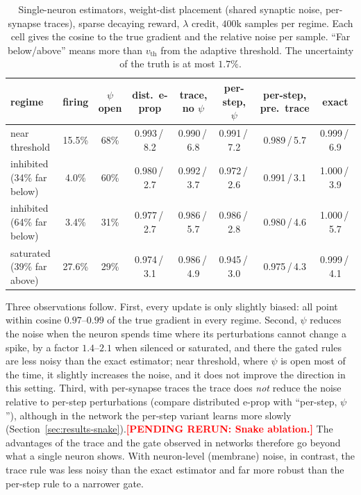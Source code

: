 \documentclass[10pt,twocolumn]{article}
\newcommand{\pending}[1]{\textcolor{red}{\bfseries[PENDING RERUN#1]}}
\begin{document}
\begin{table}[h]
\centering\footnotesize
\begin{tabular}{@{}lccccccc@{}}
\toprule
regime & firing & $\psi$ open & dist.\ e-prop & trace, no $\psi$ & per-step, $\psi$ & per-step, pre.\ trace & exact \\
\midrule
near threshold          & 15.5\% & 68\% & 0.993\,/\,8.2 & 0.990\,/\,6.8 & 0.991\,/\,7.2 & 0.989\,/\,5.7 & 0.999\,/\,6.9 \\
inhibited (34\% far below) & 4.0\% & 60\% & 0.980\,/\,2.7 & 0.992\,/\,3.7 & 0.972\,/\,2.6 & 0.991\,/\,3.1 & 1.000\,/\,3.9 \\
inhibited (64\% far below) & 3.4\% & 31\% & 0.977\,/\,2.7 & 0.986\,/\,5.7 & 0.986\,/\,2.8 & 0.980\,/\,4.6 & 1.000\,/\,5.7 \\
saturated (39\% far above) & 27.6\% & 29\% & 0.974\,/\,3.1 & 0.986\,/\,4.9 & 0.945\,/\,3.0 & 0.975\,/\,4.3 & 0.999\,/\,4.1 \\
\bottomrule
\end{tabular}
\caption{Single-neuron estimators, weight-dist placement (shared synaptic noise,
per-synapse traces), sparse decaying reward, $\lambda$ credit, $400$k samples
per regime. Each cell gives the cosine to the true gradient and the relative
noise per sample. ``Far below/above'' means more than $v_{\mathrm{th}}$ from the
adaptive threshold. The uncertainty of the truth is at most $1.7\%$.}
\label{tab:toy-regimes}
\end{table}

Three observations follow. First, every update is only slightly biased:
all point within cosine $0.97$--$0.99$ of the true gradient in every regime.
Second, $\psi$ reduces the noise when the neuron spends time where its
perturbations cannot change a spike, by a factor $1.4$--$2.1$ when silenced or
saturated, and there the gated rules are less noisy than the exact estimator;
near threshold, where $\psi$ is open most of the time, it slightly increases the
noise, and it does not improve the direction in this setting. Third, with
per-synapse traces the trace does \emph{not} reduce the noise relative to
per-step perturbations (compare distributed e-prop with ``per-step, $\psi$''),
although in the network the per-step variant learns more slowly
(Section~\ref{sec:results-snake}).\pending{: Snake ablation.} The advantages
of the trace and the gate observed in networks therefore go beyond what a
single neuron shows. With neuron-level (membrane) noise, in contrast, the trace
rule was less noisy than the exact estimator and far more robust than the
per-step rule to a narrower gate.
\end{document}
